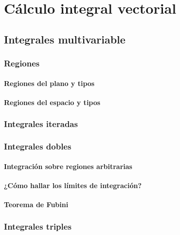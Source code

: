 \documentclass[12pt, fleqn]{report}                             %
\theoremstyle{break}                                            %
\begin{document}
\part{Cálculo integral vectorial}

    \chapter{Integrales multivariable}
    
        \section{Regiones}
        
            \subsection{Regiones del plano y tipos}
            
            \subsection{Regiones del espacio y tipos}
        
        \section{Integrales iteradas}
        
        \section{Integrales dobles}
            
            \subsection{Integración sobre regiones arbitrarias}
            
            \subsection{¿Cómo hallar los límites de integración?}
            
            \subsection{Teorema de Fubini}
        
        \section{Integrales triples}
            
\end{document}
